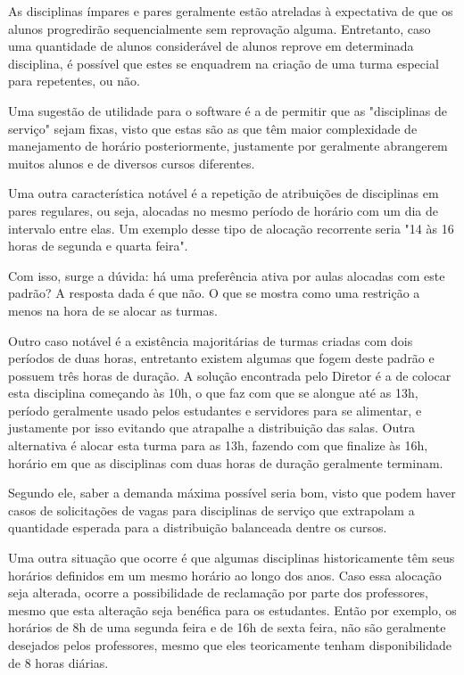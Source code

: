         As disciplinas ímpares e pares geralmente estão atreladas à expectativa de que os alunos progredirão sequencialmente sem reprovação alguma. Entretanto, caso uma quantidade de alunos considerável de alunos reprove em determinada disciplina, é possível que estes se enquadrem na criação de uma turma especial para repetentes, ou não.

        Uma sugestão de utilidade para o software é a de permitir que as "disciplinas de serviço" sejam fixas, visto que estas são as que têm maior complexidade de manejamento de horário posteriormente, justamente por geralmente abrangerem muitos alunos e de diversos cursos diferentes.

        Uma outra característica notável é a repetição de atribuições de disciplinas em pares regulares, ou seja, alocadas no mesmo período de horário com um dia de intervalo entre elas. Um exemplo desse tipo de alocação recorrente seria "14 às 16 horas de segunda e quarta feira".

        Com isso, surge a dúvida: há uma preferência ativa por aulas alocadas com este padrão? A resposta dada é que não. O que se mostra como uma restrição a menos na hora de se alocar as turmas.

        Outro caso notável é a existência majoritárias de turmas criadas com dois períodos de duas horas, entretanto existem algumas que fogem deste padrão e possuem três horas de duração. A solução encontrada pelo Diretor é a de colocar esta disciplina começando às 10h, o que faz com que se alongue até as 13h, período geralmente usado pelos estudantes e servidores para se alimentar, e justamente por isso evitando que atrapalhe a distribuição das salas. Outra alternativa é alocar esta turma para as 13h, fazendo com que finalize às 16h, horário em que as disciplinas com duas horas de duração geralmente terminam.

        Segundo ele, saber a demanda máxima possível seria bom, visto que podem haver casos de solicitações de vagas para disciplinas de serviço que extrapolam a quantidade esperada para a distribuição balanceada dentre os cursos.

        Uma outra situação que ocorre é que algumas disciplinas historicamente têm seus horários definidos em um mesmo horário ao longo dos anos. Caso essa alocação seja alterada, ocorre a possibilidade de reclamação por parte dos professores, mesmo que esta alteração seja benéfica para os estudantes. Então por exemplo, os horários de 8h de uma segunda feira e de 16h de sexta feira, não são geralmente desejados pelos professores, mesmo que eles teoricamente tenham disponibilidade de 8 horas diárias.

